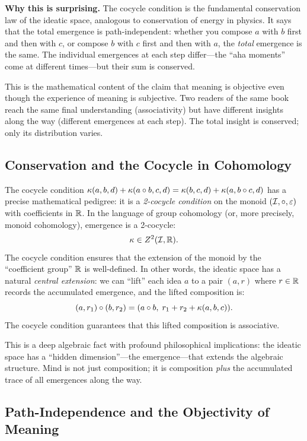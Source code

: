 \begin{surprisebox}
\noindent\textbf{Why this is surprising.}
The cocycle condition is the fundamental conservation law of the ideatic
space, analogous to conservation of energy in physics.  It says that the
total emergence is path-independent: whether you compose $a$ with $b$ first
and then with $c$, or compose $b$ with $c$ first and then with $a$, the
\emph{total} emergence is the same.  The individual emergences at each step
differ---the ``aha moments'' come at different times---but their sum is
conserved.

This is the mathematical content of the claim that meaning is objective even
though the experience of meaning is subjective.  Two readers of the same book
reach the same final understanding (associativity) but have different insights
along the way (different emergences at each step).  The total insight is
conserved; only its distribution varies.
\end{surprisebox}

\subsection{Conservation and the Cocycle in Cohomology}

The cocycle condition $\kappa(a, b, d) + \kappa(a \circ b, c, d) =
\kappa(b, c, d) + \kappa(a, b \circ c, d)$ has a precise mathematical
pedigree: it is a \emph{2-cocycle condition} on the monoid $(\mathcal{I}, \circ,
\varepsilon)$ with coefficients in $\mathbb{R}$.  In the language of group cohomology (or,
more precisely, monoid cohomology), emergence is a 2-cocycle:
\[
\kappa \in Z^2(\mathcal{I}, \mathbb{R}).
\]
The cocycle condition ensures that the extension of the monoid by the
``coefficient group'' $\mathbb{R}$ is well-defined.  In other words, the ideatic space
has a natural \emph{central extension}: we can ``lift'' each idea $a$ to a
pair $(a, r)$ where $r \in \mathbb{R}$ records the accumulated emergence, and the
lifted composition is:
\[
(a, r_1) \circ (b, r_2) = (a \circ b,\; r_1 + r_2 + \kappa(a, b, c)).
\]
The cocycle condition guarantees that this lifted composition is associative.

This is a deep algebraic fact with profound philosophical implications: the
ideatic space has a ``hidden dimension''---the emergence---that extends the
algebraic structure.  Mind is not just composition; it is composition
\emph{plus} the accumulated trace of all emergences along the way.

\subsection{Path-Independence and the Objectivity of Meaning}

